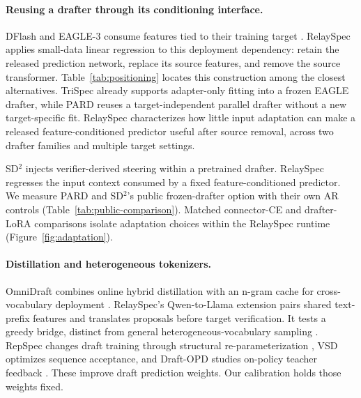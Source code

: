 \documentclass{article}
\begin{document}
\paragraph{Reusing a drafter through its conditioning interface.}
DFlash and EAGLE-3 consume features tied to their training target
\citep{chen2026dflash,li2025eagle3}. RelaySpec applies small-data linear
regression to this deployment dependency: retain the released prediction
network, replace its source features, and remove the source transformer.
Table~\ref{tab:positioning} locates this construction among the closest
alternatives. TriSpec already supports adapter-only fitting into a frozen
EAGLE drafter, while PARD reuses a target-independent parallel drafter
without a new target-specific fit. RelaySpec
characterizes how little input adaptation can make a released
feature-conditioned predictor useful after source removal, across
two drafter families and multiple target settings.

\begin{table}[H]
\caption{Training and execution requirements of closely related methods.
Table~\ref{tab:public-comparison} reports completed 128-question timings
for RelaySpec, PARD and frozen-drafter SD$^2$. TriSpec is a conceptual
comparison.}
\label{tab:positioning}
\centering

\end{table}

SD$^2$ injects verifier-derived steering within a pretrained drafter.
RelaySpec regresses the input context consumed by a fixed feature-conditioned
predictor. We measure PARD and SD$^2$'s public frozen-drafter option
with their own AR controls (Table~\ref{tab:public-comparison}). Matched
connector-CE and drafter-LoRA comparisons isolate adaptation choices
within the RelaySpec runtime (Figure~\ref{fig:adaptation}).

\paragraph{Distillation and heterogeneous tokenizers.}
OmniDraft combines online hybrid distillation with an n-gram cache for
cross-vocabulary deployment \citep{ramakrishnan2025omnidraft}.
RelaySpec's Qwen-to-Llama extension pairs shared text-prefix features
and translates proposals before target verification. It tests a greedy
bridge, distinct from general heterogeneous-vocabulary sampling
\citep{timor2025heterogeneous}. RepSpec changes draft training through
structural re-parameterization \citep{huo2026repspec}, VSD optimizes
sequence acceptance, and Draft-OPD studies on-policy teacher feedback
\citep{zou2026vsd,lei2026draftopd}. These improve draft prediction
weights. Our calibration holds those weights fixed.
\end{document}
